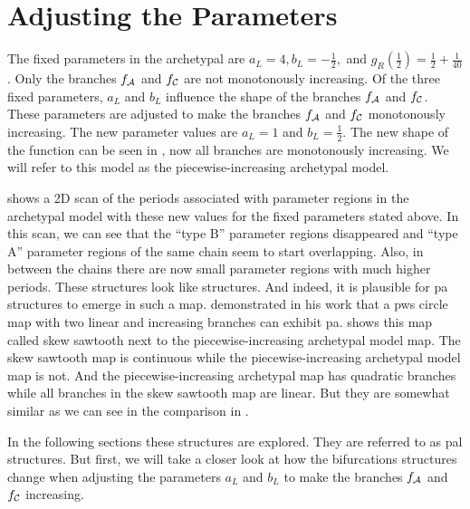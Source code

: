 \section{Adjusting the Parameters}
\label{sec:add.parameters}

The fixed parameters in the archetypal are $a_L = 4, b_L = -\frac{1}{2},$ and $g_R\left(\frac{1}{2}\right) = \frac{1}{2} + \frac{1}{40}$.
Only the branches $f_{\mathcal{A}}$ and $f_{\mathcal{C}}$ are not monotonously increasing.
Of the three fixed parameters, $a_L$ and $b_L$ influence the shape of the branches $f_{\mathcal{A}}$ and $f_{\mathcal{C}}$.
These parameters are adjusted to make the branches $f_{\mathcal{A}}$ and $f_{\mathcal{C}}$ monotonously increasing.
The new parameter values are $a_L = 1$ and $b_L = \frac{1}{2}$.
The new shape of the function can be seen in , now all branches are monotonously increasing.
We will refer to this model as the piecewise-increasing archetypal model.

 shows a 2D scan of the periods associated with parameter regions in the archetypal model with these new values for the fixed parameters stated above.
In this scan, we can see that the ``type B'' parameter regions disappeared and ``type A'' parameter regions of the same chain seem to start overlapping.
Also, in between the chains there are now small parameter regions with much higher periods.
These structures look like  structures.
And indeed, it is plausible for \gls{pa} structures to emerge in such a map.
 demonstrated in his work \cite{simpson2018saw} that a \gls{pws} circle map with two linear and increasing branches can exhibit \gls{pa}.
 shows this map called skew sawtooth next to the piecewise-increasing archetypal model map.
The skew sawtooth map is continuous while the piecewise-increasing archetypal model map is not.
And the piecewise-increasing archetypal map has quadratic branches while all branches in the skew sawtooth map are linear.
But they are somewhat similar as we can see in the comparison in .

In the following sections these structures are explored.
They are referred to as \gls{pal} structures.
But first, we will take a closer look at how the bifurcations structures change when adjusting the parameters $a_L$ and $b_L$ to make the branches $f_{\mathcal{A}}$ and $f_{\mathcal{C}}$ increasing.

